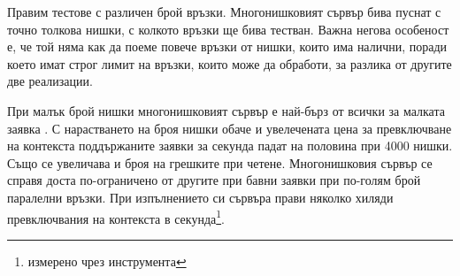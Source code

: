 \begin{table}[h]
\end{table}

Правим тестове с различен брой връзки. Многонишковият сървър бива пуснат с точно толкова нишки, с колкото връзки ще бива тестван. Важна негова особеност е, че той няма как да поеме повече връзки от нишки, които има налични, поради което имат строг лимит на връзки, които може да обработи, за разлика от другите две реализации.

При малък брой нишки многонишковият сървър е най-бърз от всички за малката заявка \code{/}. С нарастването на броя нишки обаче и увелечената цена за превключване на контекста поддържаните заявки за секунда падат на половина при 4000 нишки. Също се увеличава и броя на грешките при четене. Многонишковия сървър се справя доста по-ограничено от другите при бавни заявки при по-голям брой паралелни връзки. При изпълнението си сървъра прави няколко хиляди превключвания на контекста в секунда\footnote{измерено чрез инструмента }.

